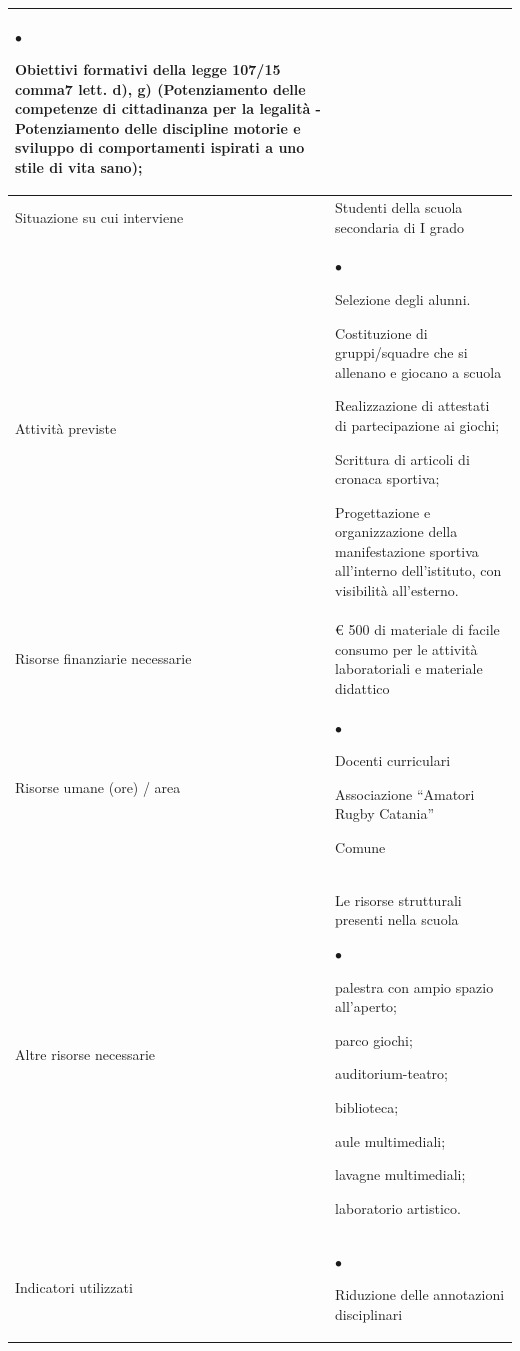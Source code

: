 \documentclass[12pt,a4paper,oneside]{memoir}
\newenvironment{elenco}{\begin{list}{$\bullet$}{%
              \setlength{\leftmargin}{4mm}%
              \setlength{\rightmargin}{1mm}%
               \setlength{\itemindent}{0mm}%
               \setlength{\labelwidth}{2mm}%
               \setlength{\labelsep}{2mm}%
              \setlength{\itemsep}{-\parsep}%
              \setlength{\partopsep}{0pt}%
              \setlength{\topsep}{0pt}%
             \setlength{\parskip}{0pt}%
              }}{\end{list}}
\begin{document}
\begin{footnotesize}
\begin{longtable}{|>{\raggedright}p{2.5cm}|>{\raggedright\arraybackslash}P{10cm}|}
\begin{elenco}
\item Obiettivi formativi della legge 107/15 comma7 lett. d), g) (Potenziamento delle competenze di cittadinanza  per la legalità - Potenziamento delle discipline motorie e sviluppo di comportamenti ispirati a uno stile di vita sano);
\end{elenco}\\[-4mm] \hline
Situazione su cui interviene&Studenti della scuola secondaria di I grado\\ \hline
Attività previste&
\begin{elenco}
\item Selezione degli alunni. 
\item Costituzione di gruppi/squadre che si allenano e giocano a scuola
\item Realizzazione di attestati di partecipazione ai giochi;
\item Scrittura di articoli di cronaca sportiva;
\item Progettazione e organizzazione della manifestazione sportiva all'interno dell'istituto, con visibilità all'esterno.
\end{elenco}\\[-4mm] \hline
Risorse finanziarie necessarie&€ 500 di materiale di facile consumo per le attività laboratoriali e materiale didattico\\ \hline
Risorse umane (ore) / area&
\begin{elenco}
\item Docenti curriculari
\item Associazione ``Amatori Rugby Catania''
\item Comune
\end{elenco}\\[-4mm] \hline
Altre risorse necessarie&Le risorse strutturali presenti nella scuola
\begin{elenco}
\item palestra con ampio spazio all'aperto;
\item parco giochi;
\item auditorium-teatro;
\item biblioteca;
\item aule multimediali;
\item lavagne multimediali;
\item laboratorio artistico.
\end{elenco}\\[-4mm] \hline
Indicatori utilizzati&
\begin{elenco}
\item Riduzione delle annotazioni disciplinari 

\end{elenco}
\end{longtable}
\end{footnotesize}
\end{document}
